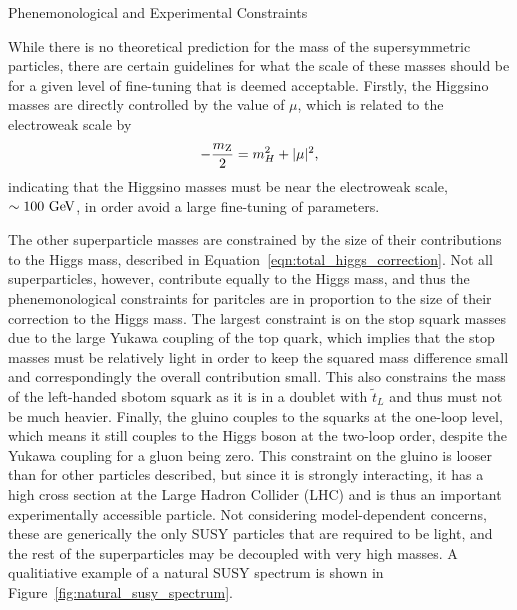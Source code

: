 \begin{section}{Phenemonological and Experimental Constraints}
\label{sec:susy_constraints}

While there is no theoretical prediction for the mass of the supersymmetric particles, there are certain guidelines for what the scale of these masses should be for a given level of fine-tuning that is deemed acceptable.
Firstly, the Higgsino masses are directly controlled by the value of $\mu$, which is related to the electroweak scale by
\begin{align}
-\frac{m_{\mathrm{Z}}}{2} = m_{H}^2 + |\mu|^2,
\end{align}
indicating that the Higgsino masses must be near the electroweak scale, $\sim 100~\mathrm{Ge\kern -0.1em V}$, in order avoid a large fine-tuning of parameters.

The other superparticle masses are constrained by the size of their contributions to the Higgs mass, described in Equation~\ref{eqn:total_higgs_correction}.
Not all superparticles, however, contribute equally to the Higgs mass, and thus the phenemonological constraints for paritcles are in proportion to the size of their correction to the Higgs mass.
The largest constraint is on the stop squark masses due to the large Yukawa coupling of the top quark, which implies that the stop masses must be relatively light in order to keep the squared mass difference small and correspondingly the overall contribution small.
This also constrains the mass of the left-handed sbotom squark as it is in a doublet with $\tilde{t}_L$ and thus must not be much heavier.
Finally, the gluino couples to the squarks at the one-loop level, which means it still couples to the Higgs boson at the two-loop order, despite the Yukawa coupling for a gluon being zero.
This constraint on the gluino is looser than for other particles described, but since it is strongly interacting, it has a high cross section at the Large Hadron Collider (LHC) and is thus an important experimentally accessible particle.
Not considering model-dependent concerns, these are generically the only SUSY particles that are required to be light, and the rest of the superparticles may be decoupled with very high masses.
A qualitiative example of a natural SUSY spectrum is shown in Figure~\ref{fig:natural_susy_spectrum}.


\end{section}
